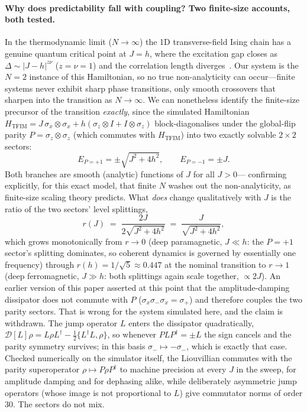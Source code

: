 \documentclass[twocolumn,10pt]{article}
\begin{document}
\paragraph{Why does predictability fall with coupling? Two finite-size
accounts, both tested.}
In the thermodynamic limit ($N\to\infty$) the 1D transverse-field
Ising chain has a genuine quantum critical point at $J=h$, where the
excitation gap closes as $\Delta\sim|J-h|^{z\nu}$ ($z=\nu=1$) and the
correlation length diverges~\cite{Pfeuty1970,Sachdev2011}.
Our system is the $N=2$ instance of this Hamiltonian, so no true
non-analyticity can occur---finite systems never exhibit sharp phase
transitions, only smooth crossovers that sharpen into the transition
as $N\to\infty$.
We can nonetheless identify the finite-size precursor of the
transition \emph{exactly}, since the simulated Hamiltonian
$H_{\mathrm{TFIM}} = J\,\sigma_x\!\otimes\!\sigma_x
+ h(\sigma_z\otimes I + I\otimes\sigma_z)$ block-diagonalises under the
global-flip parity $P=\sigma_z\otimes\sigma_z$ (which commutes with
$H_{\mathrm{TFIM}}$) into two exactly solvable $2\times2$ sectors:
\begin{equation}
  E_{P=+1} = \pm\sqrt{J^2+4h^2}, \qquad
  E_{P=-1} = \pm J.
  \label{eq:tfim-spectrum}
\end{equation}
Both branches are smooth (analytic) functions of $J$ for all $J>0$---
confirming explicitly, for this exact model, that finite $N$ washes out
the non-analyticity, as finite-size scaling theory predicts.
What \emph{does} change qualitatively with $J$ is the ratio of the two
sectors' level splittings,
\begin{equation}
  r(J) \;=\; \frac{2J}{2\sqrt{J^2+4h^2}} \;=\; \frac{J}{\sqrt{J^2+4h^2}},
  \label{eq:ratio}
\end{equation}
which grows monotonically from $r\to0$ (deep paramagnetic, $J\ll h$:
the $P{=}{+}1$ sector's splitting dominates, so coherent dynamics is
governed by essentially one frequency) through $r(h)=1/\sqrt5\approx
0.447$ at the nominal transition to $r\to1$ (deep ferromagnetic,
$J\gg h$: both splittings again scale together, $\propto2J$).
An earlier version of this paper asserted at this point that the
amplitude-damping dissipator does not commute with $P$
($\sigma_x\sigma_-\sigma_x=\sigma_+$) and therefore couples the two
parity sectors. That is wrong for the system simulated here, and the
claim is withdrawn.
The jump operator $L$ enters the dissipator quadratically,
$\mathcal{D}[L]\rho = L\rho L^\dagger - \tfrac12\{L^\dagger L,\rho\}$,
so whenever $PLP^\dagger=\pm L$ the sign cancels and the parity
symmetry survives; in this basis $\sigma_-\mapsto-\sigma_-$, which is
exactly that case.
Checked numerically on the simulator itself, the Liouvillian commutes
with the parity superoperator $\rho\mapsto P\rho P^\dagger$ to machine
precision at every $J$ in the sweep, for amplitude damping and for
dephasing alike, while deliberately asymmetric jump operators (whose
image is not proportional to $L$) give commutator norms of order $30$.
The sectors do not mix.
\end{document}

